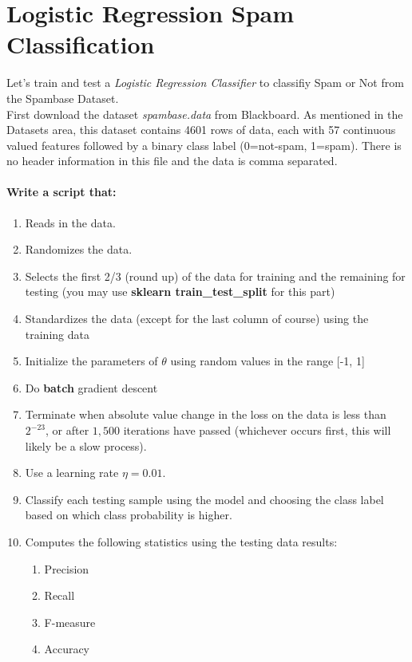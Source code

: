 \documentclass[12pt]{article}
\begin{document}
\newpage
\section{Logistic Regression Spam Classification}
Let's train and test a \emph{Logistic Regression Classifier} to classifiy Spam or Not from the Spambase Dataset.\\

\noindent
First download the dataset \emph{spambase.data} from Blackboard.  As mentioned in the Datasets area, this dataset contains 4601 rows of data, each with 57 continuous valued features followed by a binary class label (0=not-spam, 1=spam).  There is no header information in this file and the data is comma separated.  \\

\noindent
\paragraph{Write a script that:}
\begin{enumerate}
  \item Reads in the data.
  \item Randomizes the data.
  \item Selects the first 2/3 (round up) of the data for training and the remaining for testing (you may use  \textbf{sklearn train\_test\_split} for this part)
  \item Standardizes the data (except for the last column of course) using the training data
  \item Initialize the parameters of $\theta$ using random values in the range [-1, 1]
\item Do \textbf{batch} gradient descent
\item Terminate when absolute value change in the loss on the data is less than $2^{-23}$, or after $1,500$ iterations have passed (whichever occurs first, this will likely be a slow process).
\item Use a learning rate $\eta=0.01$.
  \item Classify each testing sample using the model and choosing the class label based on which class probability is higher.
  \item Computes the following statistics using the testing data results:
    \begin{enumerate}
        \item Precision
        \item Recall
        \item F-measure
        \item Accuracy
    \end{enumerate}
\end{enumerate}
\end{document}
